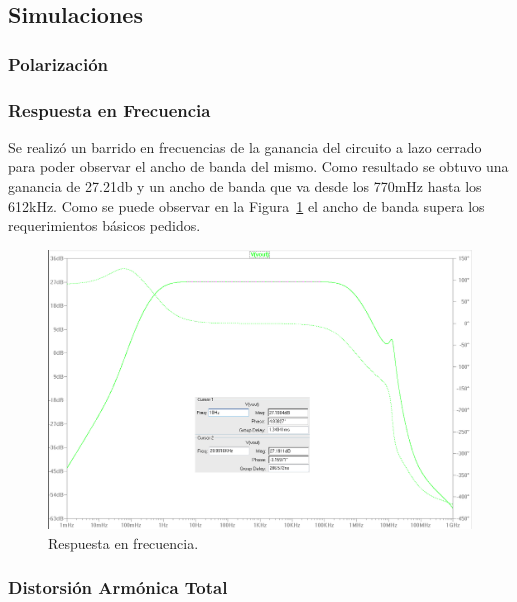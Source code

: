 \subsection{Simulaciones}
\bigskip
\subsubsection{Polarización}

\subsubsection{Respuesta en Frecuencia}

Se realizó un barrido en frecuencias de la ganancia del circuito a lazo cerrado para poder observar el ancho de banda del mismo. Como resultado se obtuvo una ganancia de 27.21db y un ancho de banda que va desde los 770mHz hasta los 612kHz.
Como se puede observar en la Figura~\ref{resp_frec} el ancho de banda supera los requerimientos básicos pedidos.

\begin{figure}[H]
\centering
\centerline{
\includegraphics[scale=0.6]{img/10hz-30khz.png}}
\caption{Respuesta en frecuencia.}
\label{resp_frec} 
\end{figure}

\bigskip
\subsubsection{Distorsión Armónica Total}
\medskip
